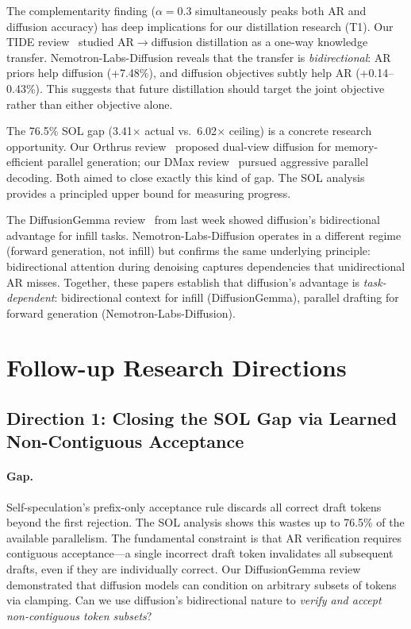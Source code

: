 \documentclass[11pt,a4paper]{article}
\begin{document}
The complementarity finding ($\alpha = 0.3$ simultaneously peaks both AR and diffusion accuracy) has deep implications for our distillation research (T1). Our TIDE review~\cite{tide2026} studied AR$\to$diffusion distillation as a one-way knowledge transfer. Nemotron-Labs-Diffusion reveals that the transfer is \emph{bidirectional}: AR priors help diffusion (+7.48\%), and diffusion objectives subtly help AR (+0.14--0.43\%). This suggests that future distillation should target the joint objective rather than either objective alone.

The 76.5\% SOL gap (3.41$\times$ actual vs.\ 6.02$\times$ ceiling) is a concrete research opportunity. Our Orthrus review~\cite{orthrus2026} proposed dual-view diffusion for memory-efficient parallel generation; our DMax review~\cite{dmax2026} pursued aggressive parallel decoding. Both aimed to close exactly this kind of gap. The SOL analysis provides a principled upper bound for measuring progress.

The DiffusionGemma review~\cite{diffusiongemma2026} from last week showed diffusion's bidirectional advantage for infill tasks. Nemotron-Labs-Diffusion operates in a different regime (forward generation, not infill) but confirms the same underlying principle: bidirectional attention during denoising captures dependencies that unidirectional AR misses. Together, these papers establish that diffusion's advantage is \emph{task-dependent}: bidirectional context for infill (DiffusionGemma), parallel drafting for forward generation (Nemotron-Labs-Diffusion).

\section{Follow-up Research Directions}

\subsection{Direction 1: Closing the SOL Gap via Learned Non-Contiguous Acceptance}

\paragraph{Gap.} Self-speculation's prefix-only acceptance rule discards all correct draft tokens beyond the first rejection. The SOL analysis shows this wastes up to 76.5\% of the available parallelism. The fundamental constraint is that AR verification requires contiguous acceptance---a single incorrect draft token invalidates all subsequent drafts, even if they are individually correct. Our DiffusionGemma review~\cite{diffusiongemma2026} demonstrated that diffusion models can condition on arbitrary subsets of tokens via clamping. Can we use diffusion's bidirectional nature to \emph{verify and accept non-contiguous token subsets}?
\end{document}
